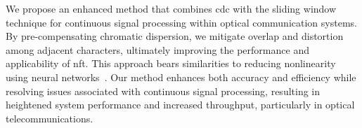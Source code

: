 We propose an enhanced method that combines \acrfull{cdc} with the sliding window technique for continuous signal processing within optical communication systems. By pre-compensating chromatic dispersion, we mitigate overlap and distortion among adjacent characters, ultimately improving the performance and applicability of \acrshort{nft}. This approach bears similarities to reducing nonlinearity using neural networks~\cite{9324921, 8535144, freire2021performance, zibar2015machine, cartledge2017digital}. Our method enhances both accuracy and efficiency while resolving issues associated with continuous signal processing, resulting in heightened system performance and increased throughput, particularly in optical telecommunications.